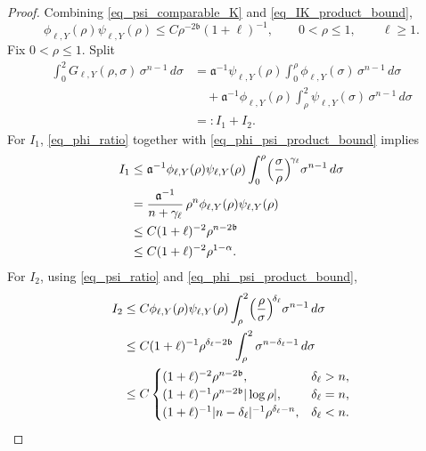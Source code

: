 \documentclass[12pt]{amsart}
\begin{document}
\begin{proof}
Combining \eqref{eq_psi_comparable_K} and \eqref{eq_IK_product_bound},
\begin{equation}\label{eq_phi_psi_product_bound}
    \phi_{\ell,Y}(\rho)\psi_{\ell,Y}(\rho)
    \le
    C\rho^{-2\mathfrak b}(1+\ell)^{-1},
    \qquad
    0<\rho\leq1,
    \qquad
    \ell\ge 1.
\end{equation}
Fix $0<\rho\le 1$. Split
\begin{equation*}
\begin{aligned}
    \int_0^2 G_{\ell,Y}(\rho,\sigma) \, \sigma^{n-1} \, d\sigma
    &=
    \mathfrak a^{-1} \psi_{\ell,Y}(\rho)
    \int_0^\rho
        \phi_{\ell,Y}(\sigma)\,\sigma^{n-1}\,d\sigma          \\
    &\quad+
    \mathfrak a^{-1} \phi_{\ell,Y}(\rho)
    \int_\rho^2
        \psi_{\ell,Y}(\sigma)\,\sigma^{n-1}\,d\sigma          \\
    &=: I_1+I_2.
\end{aligned}
\end{equation*}
For $I_1$, \eqref{eq_phi_ratio} together with \eqref{eq_phi_psi_product_bound} implies
\begin{align}\label{eq_I1_bound_schur}
    I_1 &\le \mathfrak a^{-1} \phi_{\ell,Y}(\rho)\psi_{\ell,Y}(\rho) \int_0^\rho \Bigl(\frac{\sigma}{\rho}\Bigr)^{\!\gamma_\ell} \sigma^{n-1} \, d\sigma\\ \nonumber
    &= \frac{\mathfrak a^{-1}}{n+\gamma_\ell} \, \rho^n \phi_{\ell,Y}(\rho)\psi_{\ell,Y}(\rho)\\ \nonumber
    &\le C (1+\ell)^{-2}\rho^{n-2\mathfrak b}\\ \nonumber
    &\le C (1+\ell)^{-2}\rho^{1-\alpha}.
\end{align}
For $I_2$, using \eqref{eq_psi_ratio} and \eqref{eq_phi_psi_product_bound},
\begin{align*}
    I_2 &\le C\phi_{\ell,Y}(\rho)\psi_{\ell,Y}(\rho)
    \int_\rho^2 \Bigl(\frac{\rho}{\sigma}\Bigr)^{\!\delta_\ell}\sigma^{n-1} \, d\sigma \\
    &\le C (1+\ell)^{-1} \rho^{\delta_\ell - 2 \mathfrak b} \int_\rho^2 \sigma^{n-\delta_\ell - 1} \, d\sigma \\
    &\le C \begin{cases}
        (1+\ell)^{-2} \rho^{n-2\mathfrak b}, & \delta_\ell >n,\\
        (1+\ell)^{-1} \rho^{n-2\mathfrak b} |\log{\rho}|, & \delta_\ell = n,\\
        (1+\ell)^{-1} |n-\delta_\ell|^{-1} \rho^{\delta_\ell-n}, &\delta_\ell<n.
    \end{cases}

\end{align*}
\end{proof}
\end{document}
